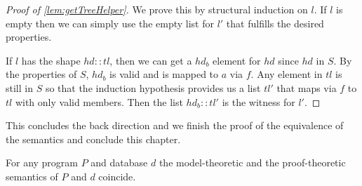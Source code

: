 \begin{proof}[Proof of \cref{lem:getTreeHelper}]
    We prove this by structural induction on $l$. If $l$ is empty then we can simply use the empty list for $l'$ that fulfills the desired properties.

    If $l$ has the shape $hd::tl$, then we can get a $hd_b$ element for $hd$ since $hd$ in $S$. By the properties of $S$, $hd_b$ is valid and is mapped to $a$ via $f$. Any element in $tl$ is still in $S$ so that the induction hypothesis provides us a list $tl'$ that maps via $f$ to $tl$ with only valid members. Then the list $hd_b::tl'$ is the witness for $l'$.
\end{proof}

This concludes the back direction and we finish the proof of the equivalence of the semantics and conclude this chapter.

\begin{theorem}[\SemanticsEquivalence]\label{trm:semanticsEquiv}
    For any program $P$ and database $d$ the model-theoretic and the proof-theoretic semantics of $P$ and $d$ coincide.
\end{theorem}